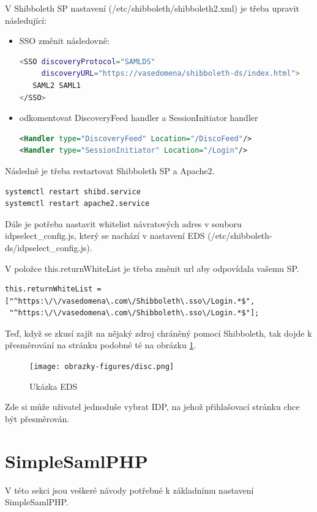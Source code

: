 V Shibboleth SP nastavení (/etc/shibboleth/shibboleth2.xml) je třeba upravit následující:\\
 \begin{itemize}
    \item
SSO změnit následovně:

\begin{lstlisting}[language=Bash]
<SSO discoveryProtocol="SAMLDS" 
     discoveryURL="https://vasedomena/shibboleth-ds/index.html">
   SAML2 SAML1
</SSO>
\end{lstlisting}
\item
odkomentovat DiscoveryFeed handler a SessionInitiator handler

\begin{lstlisting}[language=xml]
<Handler type="DiscoveryFeed" Location="/DiscoFeed"/>
<Handler type="SessionInitiator" Location="/Login"/>
\end{lstlisting}
\end{itemize}
Následně je třeba restartovat Shibboleth SP a Apache2.

\begin{lstlisting}[language=Bash]
systemctl restart shibd.service
systemctl restart apache2.service
\end{lstlisting}

Dále je potřeba nastavit whitelist návratových adres v souboru idpselect\_config.js, který se nachází v nastavení EDS (/etc/shibboleth-ds/idpselect\_config.js).

V položce this.returnWhiteList je třeba změnit url aby odpovídala vašemu SP. 

\begin{lstlisting}[]
this.returnWhiteList = 
["^https:\/\/vasedomena\.com\/Shibboleth\.sso\/Login.*$",
 "^https:\/\/vasedomena\.com\/Shibboleth\.sso\/Login.*$"];
\end{lstlisting}

Teď, když se zkusí zajít na nějaký zdroj chráněný pomocí Shibboleth, tak dojde k přesměrování na stránku podobné té na obrázku \ref{EDS}.

\begin{figure}[hbp]
	\centering
    \texttt{[image: obrazky-figures/disc.png]}
	\caption{Ukázka EDS}
	\label{EDS}
\end{figure}

Zde si může uživatel jednoduše vybrat IDP, na jehož přihlašovací stránku chce být přesměrován.

\section{SimpleSamlPHP} %
V této sekci jsou veškeré návody potřebné k základnímu nastavení SimpleSamlPHP.
